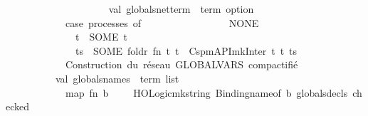 \begin{isabellebody}
\ \ \ \ \ \ \ \ \ \ \isanewline
\ \ \ \ \ \ \ \ \ \ val\ globals{\isacharunderscore}{\kern0pt}net{\isacharunderscore}{\kern0pt}term\ {\isacharcolon}{\kern0pt}\ term\ option\ {\isacharequal}{\kern0pt}\isanewline
\ \ \ \ \ \ \ \ \ \ \ \ {\isacharparenleft}{\kern0pt}case\ processes\ of\isanewline
\ \ \ \ \ \ \ \ \ \ \ \ \ \ \ {\isacharbrackleft}{\kern0pt}{\isacharbrackright}{\kern0pt}\ {\isacharequal}{\kern0pt}{\isachargreater}{\kern0pt}\ NONE\isanewline
\ \ \ \ \ \ \ \ \ \ \ \ \ {\isacharbar}{\kern0pt}\ {\isacharbrackleft}{\kern0pt}t{\isacharbrackright}{\kern0pt}\ {\isacharequal}{\kern0pt}{\isachargreater}{\kern0pt}\ SOME\ t\isanewline
\ \ \ \ \ \ \ \ \ \ \ \ \ {\isacharbar}{\kern0pt}\ ts\ {\isacharequal}{\kern0pt}{\isachargreater}{\kern0pt}\ SOME\ {\isacharparenleft}{\kern0pt}foldr{}\ {\isacharparenleft}{\kern0pt}fn\ {\isacharparenleft}{\kern0pt}t{}{\isacharcomma}{\kern0pt}\ t{}{\isacharparenright}{\kern0pt}\ {\isacharequal}{\kern0pt}{\isachargreater}{\kern0pt}\ Cspm{\isacharunderscore}{\kern0pt}API{\isachardot}{\kern0pt}mk{\isacharunderscore}{\kern0pt}Inter\ t{}\ t{}{\isacharparenright}{\kern0pt}\ ts{\isacharparenright}{\kern0pt}{\isacharparenright}{\kern0pt}{\isacharasterisk}{\kern0pt}{\isacharparenright}{\kern0pt}\isanewline
\isanewline
\ \ \ \ \ \ \ \ \ \ {\isacharparenleft}{\kern0pt}{\isacharasterisk}{\kern0pt}\ {}{\isachardot}{\kern0pt}\ Construction\ du\ réseau\ GLOBALVARS\ compactifié\ {\isacharminus}{\kern0pt}{\isacharminus}{\kern0pt}{\isacharminus}{\kern0pt}{\isacharminus}{\kern0pt}{\isacharminus}{\kern0pt}{\isacharminus}{\kern0pt}{\isacharminus}{\kern0pt}{\isacharminus}{\kern0pt}{\isacharminus}{\kern0pt}{\isacharminus}{\kern0pt}{\isacharminus}{\kern0pt}{\isacharminus}{\kern0pt}{\isacharminus}{\kern0pt}{\isacharminus}{\kern0pt}{\isacharminus}{\kern0pt}{\isacharminus}{\kern0pt}{\isacharminus}{\kern0pt}{\isacharminus}{\kern0pt}{\isacharminus}{\kern0pt}{\isacharminus}{\kern0pt}{\isacharminus}{\kern0pt}{\isacharminus}{\kern0pt}{\isacharminus}{\kern0pt}{\isacharminus}{\kern0pt}{\isacharminus}{\kern0pt}\ {\isacharasterisk}{\kern0pt}{\isacharparenright}{\kern0pt}\isanewline
\ \ \ \ \ \ \ \ \ \ val\ globals{\isacharunderscore}{\kern0pt}names\ {\isacharcolon}{\kern0pt}\ term\ list\ {\isacharequal}{\kern0pt}\isanewline
\ \ \ \ \ \ \ \ \ \ \ \ map\ {\isacharparenleft}{\kern0pt}fn\ {\isacharparenleft}{\kern0pt}b{\isacharcomma}{\kern0pt}\ {\isacharunderscore}{\kern0pt}{\isacharcomma}{\kern0pt}\ {\isacharunderscore}{\kern0pt}{\isacharcomma}{\kern0pt}\ {\isacharunderscore}{\kern0pt}{\isacharparenright}{\kern0pt}\ {\isacharequal}{\kern0pt}{\isachargreater}{\kern0pt}\ HOLogic{\isachardot}{\kern0pt}mk{\isacharunderscore}{\kern0pt}string\ {\isacharparenleft}{\kern0pt}Binding{\isachardot}{\kern0pt}name{\isacharunderscore}{\kern0pt}of\ b{\isacharparenright}{\kern0pt}{\isacharparenright}{\kern0pt}\ {\isacharparenleft}{\kern0pt}{\isacharhash}{\kern0pt}globals{\isacharunderscore}{\kern0pt}decls\ checked{\isacharparenright}{\kern0pt}\isanewline

\end{isabellebody}
